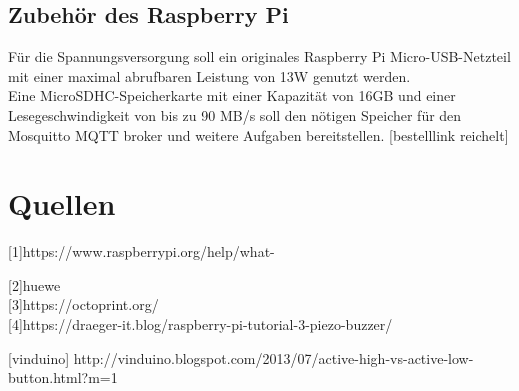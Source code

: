 \documentclass[12pt,a4paper,openany]{scrbook}
\begin{document}
\section{Zubehör des Raspberry Pi}

Für die Spannungsversorgung soll ein originales Raspberry Pi Micro-USB-Netzteil mit einer maximal abrufbaren Leistung von 13W genutzt werden.\\[0,5cm]

Eine MicroSDHC-Speicherkarte mit einer Kapazität von 16GB und einer Lesegeschwindigkeit von bis zu 90 MB/s soll den nötigen Speicher für den Mosquitto MQTT broker und weitere Aufgaben bereitstellen. [bestelllink reichelt] 


\vspace{1cm}
\centering

\chapter{Quellen}
[1]https://www.raspberrypi.org/help/what-%

[2]huewe\\ 

[3]https://octoprint.org/\\ 

[4]https://draeger-it.blog/raspberry-pi-tutorial-3-piezo-buzzer/

[vinduino] http://vinduino.blogspot.com/2013/07/active-high-vs-active-low-button.html?m=1  
\end{document}
